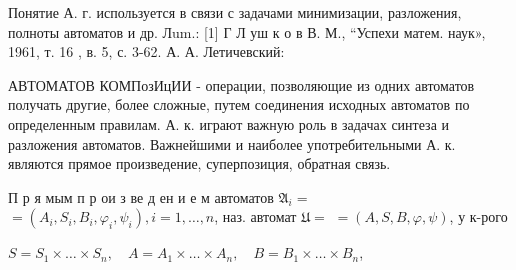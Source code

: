 \documentclass[10pt]{article}
\begin{document}
Понятие А. г. используется в связи с задачами минимизации, разложения, полноты автоматов и др. Лum.: [1] Г Л уш к о в В. М., “Успехи матем. наук», 1961, т. 16 , в. 5, с. 3-62. А. А. Летичевский:



АВТОМАТОВ КОМПозИцИИ - операции, позволяющие из одних автоматов получать другие, более сложные, путем соединения исходных автоматов по определенным правилам. А. к. играют важную роль в задачах синтеза и разложения автоматов. Важнейшими и наиболее употребительными А. к. являются прямое произведение, суперпозиция, обратная связь.



П р я мым п р ои з ве д ен и е м автоматов $\mathfrak{A}_{i}=$ $=\left(A_{i}, S_{i}, B_{i}, \varphi_{i}, \psi_{i}\right), i=1, \ldots, n$, наз. автомат $\mathfrak{U}=$ $=(A, S, B, \varphi, \psi)$, у к-рого



$S=S_{1} \times \ldots \times S_{n}, \quad A=A_{1} \times \ldots \times A_{n}, \quad B=B_{1} \times \ldots \times B_{n}$,
\end{document}
